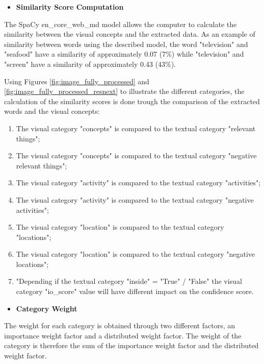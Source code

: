     

    \begin{itemize}
      \item \textbf{Similarity Score Computation}
    \end{itemize}

    The SpaCy en\_core\_web\_md model allows the computer to calculate the similarity between the visual concepts and the extracted data. As an example of similarity between words using the described model, the word "television" and "seafood" have a similarity of approximately 0.07 (7\%) while "television" and "screen" have a similarity of approximately 0.43 (43\%).
    
      
    Using Figures \ref{fig:image_fully_processed} and \ref{fig:image_fully_processed_resnext} to illustrate the different categories, the calculation of the similarity scores is done trough the comparison of the extracted words and the visual concepts:
    \begin{enumerate}
        \itemsep0em
        \item The visual category "concepts" is compared to the textual category "relevant things";
        \item The visual category "concepts" is compared to the textual category "negative relevant things";
        \item The visual category "activity" is compared to the textual category "activities";
        \item The visual category "activity" is compared to the textual category "negative activities";
        \item The visual category "location" is compared to the textual category "locations";
        \item The visual category "location" is compared to the textual category "negative locations";
        \item "Depending if the textual category "inside" = "True" / "False" the visual category "io\_score" value will have different impact on the confidence score.
    \end{enumerate}

    \begin{itemize}
      \item \textbf{Category Weight}
    \end{itemize}


    The weight for each category is obtained through two different factors, an importance weight factor and a distributed weight factor. The weight of the category is therefore the sum of the importance weight factor and the distributed weight factor. 

